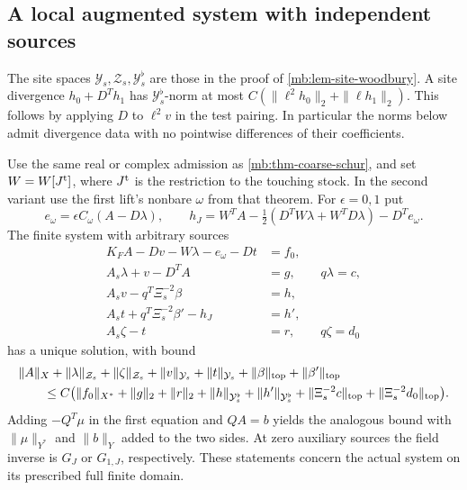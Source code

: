 \documentclass[11pt,letterpaper,reqno]{amsart}
\makeatletter
\numberwithin{equation}{section}
\theoremstyle{definition}
\newcommand{\ms@minorstart}{%
  \pushQED{\qed}\renewcommand{\qedsymbol}{$\blacksquare$}}
\newenvironment{proposition}[1][]{\ms@minorstart\ms@proposition[#1]}
  {\popQED\endms@proposition}
\theoremstyle{remark}
\makeatother
\begin{document}
\subsection{A local augmented system with independent sources}

The site spaces \(\mathcal Y_s,\mathcal Z_s,\mathcal Y_s^\flat\) are those in the proof of \cref{mb:lem-site-woodbury}. A site divergence \(h_0+D^Th_1\) has \(\mathcal Y_s^\flat\)-norm at most \(C(\|\ell^2h_0\|_2+\|\ell h_1\|_2)\). This follows by applying \(D\) to \(\ell^2v\) in the test pairing. In particular the norms below admit divergence data with no pointwise differences of their coefficients.

\begin{proposition}[Unfolded response]
\label{mb:prop-unfolded-response}
Use the same real or complex admission as \cref{mb:thm-coarse-schur}, and set \(W=W[J^{\rm t}]\), where \(J^{\rm t}\) is the restriction to the touching stock. In the second variant use the first lift's nonbare \(\omega\) from that theorem. For \(\epsilon=0,1\) put
\[
 e_\omega=\epsilon C_\omega(A-D\lambda),\qquad
 h_J=W^TA-\tfrac12(D^TW\lambda+W^TD\lambda)-D^T e_\omega.
\]
The finite system with arbitrary sources
\begin{equation}\label{mb:eq-unfolded-response}
 \begin{aligned}
 K_FA-Dv-W\lambda-e_\omega-Dt&=f_0,\\
 A_s\lambda+v-D^TA&=g,\qquad q\lambda=c,\\
 A_sv-q^T\Xi_s^{-2}\beta&=h,\\
 A_st+q^T\Xi_s^{-2}\beta'-h_J&=h',\\
 A_s\zeta-t&=r,\qquad q\zeta=d_0
 \end{aligned}
\end{equation}
has a unique solution, with bound
\[
 \begin{aligned}
 &\|A\|_X+\|\lambda\|_{\mathcal Z_s}+\|\zeta\|_{\mathcal Z_s}+\|v\|_{\mathcal Y_s}+\|t\|_{\mathcal Y_s}+
        \|\beta\|_{\rm top}+\|\beta'\|_{\rm top}\\
 &\qquad\le C\bigl(\|f_0\|_{X^*}+\|g\|_2+\|r\|_2+
      \|h\|_{\mathcal Y_s^\flat}+\|h'\|_{\mathcal Y_s^\flat}
      +\|\Xi_s^{-2}c\|_{\rm top}+\|\Xi_s^{-2}d_0\|_{\rm top}\bigr).
 \end{aligned}
\]
Adding \(-Q^T\mu\) in the first equation and \(QA=b\) yields the analogous bound with \(\|\mu\|_{Y^*}\) and \(\|b\|_Y\) added to the two sides. At zero auxiliary sources the field inverse is \(G_J\) or \(G_{1,J}\), respectively. These statements concern the actual system on its prescribed full finite domain.
\end{proposition}
\end{document}
